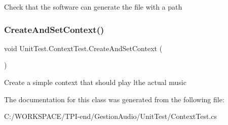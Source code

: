 Check that the software can generate the file with a path 

\mbox{\label{class_unit_test_1_1_context_test_ae26d0ac0f712020e05ddc3c4aca1c8f3}} 
\subsubsection{\texorpdfstring{Create\+And\+Set\+Context()}{CreateAndSetContext()}}
{\footnotesize\ttfamily void Unit\+Test.\+Context\+Test.\+Create\+And\+Set\+Context (\begin{DoxyParamCaption}{ }\end{DoxyParamCaption})}



Create a simple context that should play lthe actual music 



The documentation for this class was generated from the following file\+:\begin{DoxyCompactItemize}
\item 
C\+:/\+W\+O\+R\+K\+S\+P\+A\+C\+E/\+T\+P\+I-\/end/\+Gestion\+Audio/\+Unit\+Test/Context\+Test.\+cs\end{DoxyCompactItemize}
